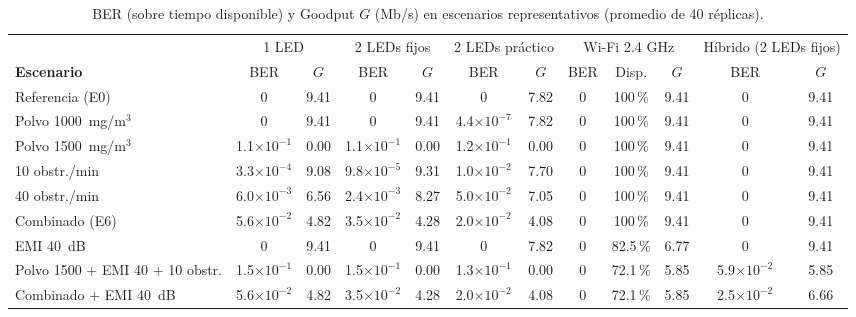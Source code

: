 \documentclass[conference]{IEEEtran}
\begin{document}
\begin{table}[!t]
\caption{BER (sobre tiempo disponible) y Goodput $G$ (Mb/s) en escenarios representativos (promedio de 40 réplicas).}
\label{tab:res}
\centering
\footnotesize
\begin{tabular}{lccccccccccc}
\toprule
 & \multicolumn{2}{c}{1 LED} & \multicolumn{2}{c}{2 LEDs fijos} & \multicolumn{2}{c}{2 LEDs práctico} & \multicolumn{3}{c}{Wi-Fi 2.4 GHz} & \multicolumn{2}{c}{Híbrido (2 LEDs fijos)}\\
\cmidrule(lr){2-3}\cmidrule(lr){4-5}\cmidrule(lr){6-7}\cmidrule(lr){8-10}\cmidrule(lr){11-12}
\textbf{Escenario} & BER & $G$ & BER & $G$ & BER & $G$ & BER & Disp. & $G$ & BER & $G$\\
\midrule
Referencia (E0) & 0 & 9.41 & 0 & 9.41 & 0 & 7.82 & 0 & 100\,\% & 9.41 & 0 & 9.41 \\
Polvo 1000~mg/m$^3$ & 0 & 9.41 & 0 & 9.41 & 4.4$\times10^{-7}$ & 7.82 & 0 & 100\,\% & 9.41 & 0 & 9.41 \\
Polvo 1500~mg/m$^3$ & 1.1$\times10^{-1}$ & 0.00 & 1.1$\times10^{-1}$ & 0.00 & 1.2$\times10^{-1}$ & 0.00 & 0 & 100\,\% & 9.41 & 0 & 9.41 \\
10 obstr./min & 3.3$\times10^{-4}$ & 9.08 & 9.8$\times10^{-5}$ & 9.31 & 1.0$\times10^{-2}$ & 7.70 & 0 & 100\,\% & 9.41 & 0 & 9.41 \\
40 obstr./min & 6.0$\times10^{-3}$ & 6.56 & 2.4$\times10^{-3}$ & 8.27 & 5.0$\times10^{-2}$ & 7.05 & 0 & 100\,\% & 9.41 & 0 & 9.41 \\
Combinado (E6) & 5.6$\times10^{-2}$ & 4.82 & 3.5$\times10^{-2}$ & 4.28 & 2.0$\times10^{-2}$ & 4.08 & 0 & 100\,\% & 9.41 & 0 & 9.41 \\
EMI 40~dB & 0 & 9.41 & 0 & 9.41 & 0 & 7.82 & 0 & 82.5\,\% & 6.77 & 0 & 9.41 \\
Polvo 1500 + EMI 40 + 10 obstr. & 1.5$\times10^{-1}$ & 0.00 & 1.5$\times10^{-1}$ & 0.00 & 1.3$\times10^{-1}$ & 0.00 & 0 & 72.1\,\% & 5.85 & 5.9$\times10^{-2}$ & 5.85 \\
Combinado + EMI 40~dB & 5.6$\times10^{-2}$ & 4.82 & 3.5$\times10^{-2}$ & 4.28 & 2.0$\times10^{-2}$ & 4.08 & 0 & 72.1\,\% & 5.85 & 2.5$\times10^{-2}$ & 6.66 \\
\bottomrule
\end{tabular}
\end{table}
\end{document}

